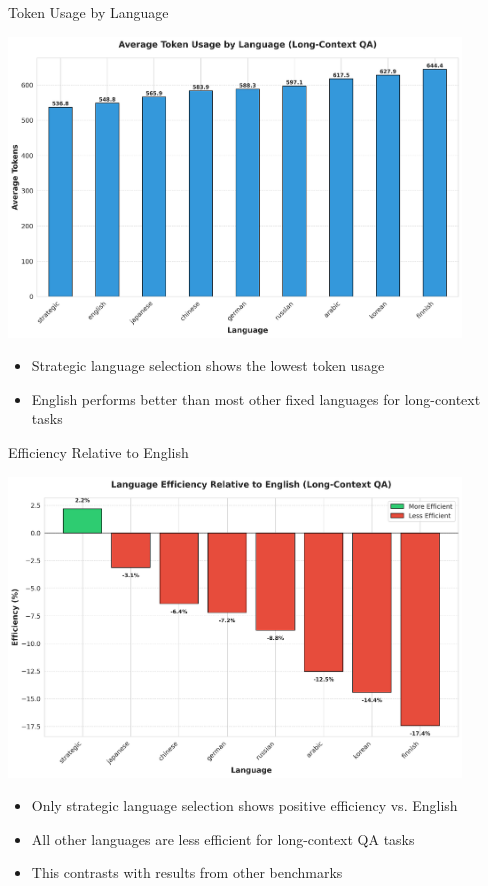 \documentclass{beamer}
\begin{document}
\begin{frame}{Token Usage by Language}
    \begin{center}
        \includegraphics[width=0.9\textwidth]{visualizations/presentation/token_usage_by_language.png}
    \end{center}
    
    \begin{itemize}
        \item Strategic language selection shows the lowest token usage
        \item English performs better than most other fixed languages for long-context tasks
    \end{itemize}
\end{frame}

\begin{frame}{Efficiency Relative to English}
    \begin{center}
        \includegraphics[width=0.9\textwidth]{visualizations/presentation/efficiency_vs_english.png}
    \end{center}
    
    \begin{itemize}
        \item Only strategic language selection shows positive efficiency vs. English
        \item All other languages are less efficient for long-context QA tasks
        \item This contrasts with results from other benchmarks
    \end{itemize}
\end{frame}
\end{document}
